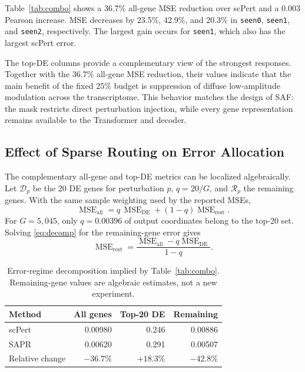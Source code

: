 \documentclass[conference]{IEEEtran}
\newcommand{\method}{SAPR}
\newcommand{\saf}{SAF}
\begin{document}
Table~\ref{tab:combo} shows a 36.7\% all-gene MSE reduction over scPert and a
0.003 Pearson increase. MSE decreases by 23.5\%, 42.9\%, and 20.3\% in
\texttt{seen0}, \texttt{seen1}, and \texttt{seen2}, respectively. The largest
gain occurs for \texttt{seen1}, which also has the largest scPert error.

The top-DE columns provide a complementary view of the strongest responses.
Together with the 36.7\% all-gene MSE reduction, their values indicate that the
main benefit of the fixed 25\% budget is suppression of diffuse low-amplitude
modulation across the transcriptome. This behavior matches the design of
\saf{}: the mask restricts direct perturbation injection, while every gene
representation remains available to the Transformer and decoder.

\subsection{Effect of Sparse Routing on Error Allocation}
The complementary all-gene and top-DE metrics can be localized algebraically.
Let $\mathcal{D}_p$ be the 20 DE genes for
perturbation $p$, $q=20/G$, and $\mathcal{R}_p$ the remaining genes. With the
same sample weighting used by the reported MSEs,
\begin{equation}
 \operatorname{MSE}_{\mathrm{all}}
 =q\,\operatorname{MSE}_{\mathrm{DE}}+
 (1-q)\operatorname{MSE}_{\mathrm{rest}}.
 \label{eq:decomp}
\end{equation}
For $G=5{,}045$, only $q=0.00396$ of output coordinates belong to the top-20
set. Solving \eqref{eq:decomp} for the remaining-gene error gives
\begin{equation}
 \operatorname{MSE}_{\mathrm{rest}}=
 \frac{\operatorname{MSE}_{\mathrm{all}}-
 q\operatorname{MSE}_{\mathrm{DE}}}{1-q}.
\end{equation}

\begin{table}[t]
\centering
\caption{Error-regime decomposition implied by Table~\ref{tab:combo}.
Remaining-gene values are algebraic estimates, not a new experiment.}
\label{tab:decomp}
\begin{tabular}{lrrr}
\toprule
Method & All genes & Top-20 DE & Remaining \\
\midrule
scPert & 0.00980 & 0.246 & 0.00886 \\
\method{} & 0.00620 & 0.291 & 0.00507 \\
\midrule
Relative change & $-36.7\%$ & $+18.3\%$ & $-42.8\%$ \\
\bottomrule
\end{tabular}
\end{table}
\end{document}
